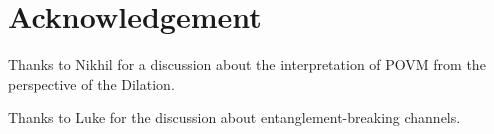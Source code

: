 \documentclass[10pt, a4paper]{article}
\begin{document}
{\section{Acknowledgement}

Thanks to Nikhil for a discussion about the interpretation of POVM from the perspective of the Dilation. 

Thanks to Luke for the discussion about entanglement-breaking channels. 

}




\end{document}
